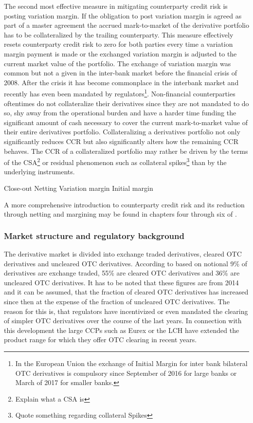 \documentclass[../Thesis_AHoecherl.tex]{subfiles}
\begin{document}
    The second most effective measure in mitigating counterparty credit risk is posting variation margin. If the obligation to post variation margin is agreed as part of a master agreement the accrued mark-to-market of the derivative portfolio has to be collateralized by the trailing counterparty. This measure effectively resets counterparty credit risk to zero for both parties every time a variation margin payment is made or the exchanged variation margin is adjusted to the current market value of the portfolio. The exchange of variation margin was common but not a given in the inter-bank market before the financial crisis of 2008. After the crisis it has become commonplace in the interbank market and recently has even been mandated by regulators\footnote{In the European Union the exchange of Initial Margin for inter bank bilateral OTC derivatives is compulsory since September of 2016 for large banks or March of 2017 for smaller banks.}. Non-financial counterparties oftentimes do not collateralize their derivatives since they are not mandated to do so, shy away from the operational burden and have a harder time funding the significant amount of cash necessary to cover the current mark-to-market value of their entire derivatives portfolio. Collateralizing a derivatives portfolio not only significantly reduces CCR but also significantly alters how the remaining CCR behaves. The CCR of a collateralized portfolio may rather be driven by the terms of the CSA\footnote{Explain what a CSA is} or residual phenomenon such as collateral spikes\footnote{Quote something regarding collateral Spikes} than by the underlying instruments.
    
    
    Close-out Netting
    Variation margin
    Initial margin
    
    A more comprehensive introduction to counterparty credit risk and its reduction through netting and margining may be found in chapters four through six of \citep{gregory2015xva}.
    \subsubsection{Market structure and regulatory background}
    The derivative market is divided into exchange traded derivatives, cleared OTC derivatives and uncleared OTC derivatives. According to \citep[Figure~3.2]{gregory2015xva} based on notional 9\% of derivatives are exchange traded, 55\% are cleared OTC derivatives and 36\% are uncleared OTC derivatives. It has to be noted that these figures are from 2014 and it can be assumed, that the fraction of cleared OTC derivatives has increased since then at the expense of the fraction of uncleared OTC derivatives. The reason for this is, that regulators have incentivized or even mandated the clearing of simpler OTC derivatives over the course of the last years. In connection with this development the large CCPs such as Eurex or the LCH have extended the product range for which they offer OTC clearing in recent years.
    
\end{document}
